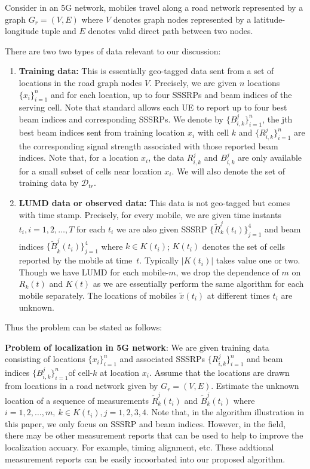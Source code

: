 \documentclass[conference, 10pt]{IEEEtran}
\newcommand{\abs}[1]{\lvert #1 \rvert}
\newcommand{\card}[1]{\abs{#1}}
\begin{document}
Consider in an 5G network, mobiles travel along a road network represented by a graph $G_r=(V,E)$ where $V$
denotes graph nodes represented by a latitude-longitude tuple and $E$ denotes
valid direct path between two nodes.

There are two two types of data relevant to our discussion:

\begin{enumerate}

\item \textbf{Training data:} This is essentially geo-tagged data sent from
a set of locations in the road graph nodes $V$. Precisely, we are given $n$ locations
$\{x_i\}_{i=1}^n$ and for each location, up to four SSSRPs and beam indices of
the serving cell. Note that standard allows each UE to report up to four best beam indices and corresponding SSSRPs.
We denote by $\{B^{j}_{i,k}\}_{i=1}^n$, the jth best beam indices sent from training location $x_i$ with cell $k$ and $\{R^j_{i,k}\}_{i=1}^n$ are the corresponding signal strength 
associated with those reported beam indices. Note
that, for a location $x_i$, the data $R^j_{i,k}$  and $B^j_{i,k}$ are only available
for a small subset of cells near location $x_i$. We will also denote the set of
training data by $\mathcal{D}_{tr}$.

\item \textbf{LUMD data or observed data:} This data is not geo-tagged but comes
with time stamp. Precisely, for every mobile, we are given time instants
$t_i, i=1,2,\hdots,T$ for each $t_i$ we are also given SSSRP
$\{{\tilde{R}}^j_k(t_i)\}_{j=1}^4$ and beam indices ${\{\tilde{B}}^j_k(t_i)\}_{j=1}^4$ where $k\in K(t_i)$; $K(t_i)$ denotes the set of cells reported by
the mobile at time~$t$. Typically $\card{K(t_i)}$ takes value one or two.
Though we have LUMD for each mobile-$m$, we drop the dependence of $m$
on $R_k(t)$ and $K(t)$ as we are essentially perform the same algorithm
for each mobile separately. The locations of mobiles $\tilde{x}(t_i)$ at different
times $t_i$ are unknown.
	
\end{enumerate} 

Thus the problem can be stated as follows:

 {\bf Problem of localization in 5G network}: We are given training data consisting
of locations $\{x_i\}_{i=1}^n$ and associated SSSRPs  $\{R^j_{i,k}\}_{i=1}^n$ and beam indices $\{B^j_{i,k}\}_{i=1}^n$of
cell-$k$ at location $x_i$. Assume that the locations
are drawn from locations in a road network given by $G_r=(V,E)$. Estimate the unknown location of a sequence of measurements
${\tilde{R}}^j_k(t_i)$ and ${\tilde{B}}^j_k(t_i)$ where $i=1,2,\hdots,m,\ k\in K(t_i), j=1, 2, 3, 4$. 
Note that, in the algorithm illustration in this paper, we only focus on SSSRP and beam indices. However, in the field, there may be other measurement reports that 
can be used to help to improve the localization accuary. For example, timing alignment, etc. These addtional measurement reports can be easily incoorbated into our proposed algorithm.
\end{document}
